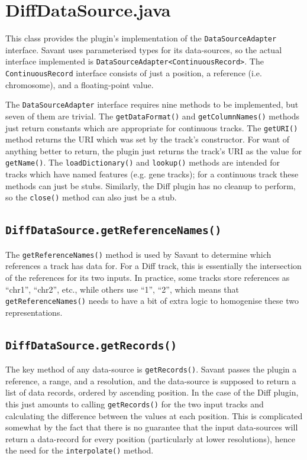 \documentclass[times,11pt]{report}
\begin{document}
\section{DiffDataSource.java}
This class provides the plugin's implementation of the {\tt DataSourceAdapter} interface.  Savant uses parameterised types for its data-sources, so the actual interface implemented is {\tt DataSourceAdapter<ContinuousRecord>}.  The {\tt ContinuousRecord} interface consists of just a position, a reference (i.e. chromosome), and a floating-point value.

The {\tt DataSourceAdapter} interface requires nine methods to be implemented, but seven of them are trivial.  The {\tt getDataFormat()} and {\tt getColumnNames()} methods just return constants which are appropriate for continuous tracks.  The {\tt getURI()} method returns the URI which was set by the track's constructor.  For want of anything better to return, the plugin just returns the track's URI as the value for {\tt getName()}.  The {\tt loadDictionary()} and {\tt lookup()} methods are intended for tracks which have named features (e.g. gene tracks); for a continuous track these methods can just be stubs.  Similarly, the Diff plugin has no cleanup to perform, so the {\tt close()} method can also just be a stub.

\subsection{\tt DiffDataSource.getReferenceNames()}
The {\tt getReferenceNames()} method is used by Savant to determine which references a track has data for.  For a Diff track, this is essentially the intersection of the references for its two inputs. In practice, some tracks store references as ``chr1'', ``chr2'', etc., while others use ``1'', ``2'', which means that {\tt getReferenceNames()} needs to have a bit of extra logic to homogenise these two representations.

\subsection{\tt DiffDataSource.getRecords()}
The key method of any data-source is {\tt getRecords()}.  Savant passes the plugin a reference, a range, and a resolution, and the data-source is supposed to return a list of data records, ordered by ascending position.  In the case of the Diff plugin, this just amounts to calling {\tt getRecords()} for the two input tracks and calculating the difference between the values at each position.  This is complicated somewhat by the fact that there is no guarantee that the input data-sources will return a data-record for every position (particularly at lower resolutions), hence the need for the {\tt interpolate()} method.
\end{document}

